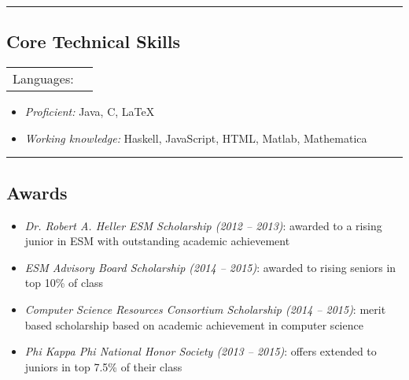 \documentclass[10pt,letterpaper]{article}
\makeatletter
\newcommand{\headerrow}[2]
{\begin{tabular*}{\linewidth}{l@{\extracolsep{\fill}}r}
	#1 &
	#2 \\
\end{tabular*}}
\makeatother
\begin{document}
\hrule
\vspace{-0.4em}
\subsection*{Core Technical Skills}

\begin{description}
	\item
	\headerrow {Languages:}{}
	\begin{itemize}
		\item \textit{Proficient:} Java, C, \LaTeX
		\item \textit{Working knowledge:} Haskell, JavaScript, HTML, Matlab, Mathematica
	\end{itemize}
	
\end{description}


\hrule
\vspace{-0.4em}
\subsection*{Awards}
\begin{itemize}
	\item \textit{Dr. Robert A. Heller ESM Scholarship (2012 – 2013)}: awarded to a rising junior in ESM with outstanding academic achievement
	\item \textit{ESM Advisory Board Scholarship (2014 – 2015)}: awarded to rising seniors in top 10\% of class
	\item \textit{Computer Science Resources Consortium Scholarship (2014 – 2015)}: merit based scholarship based on academic achievement in computer science
	\item \textit{Phi Kappa Phi National Honor Society (2013 – 2015)}: offers extended to juniors in top 7.5\% of their class
\end{itemize}
\end{document}
